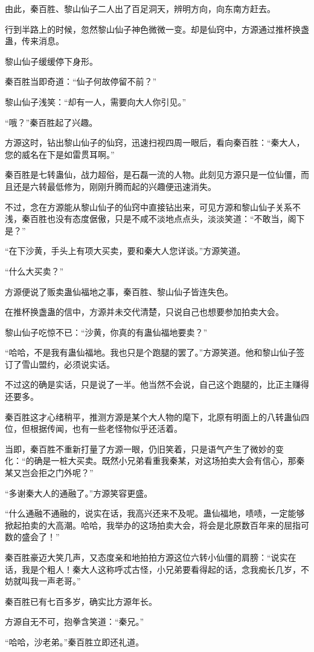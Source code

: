 \begin{this_body}
由此，秦百胜、黎山仙子二人出了百足洞天，辨明方向，向东南方赶去。

行到半路上的时候，忽然黎山仙子神色微微一变。却是仙窍中，方源通过推杯换盏蛊，传来消息。

黎山仙子缓缓停下身形。

秦百胜当即奇道：“仙子何故停留不前？”

黎山仙子浅笑：“却有一人，需要向大人你引见。”

“哦？”秦百胜起了兴趣。

方源这时，钻出黎山仙子的仙窍，迅速扫视四周一眼后，看向秦百胜：“秦大人，您的威名在下是如雷贯耳啊。”

秦百胜是七转蛊仙，战力超俗，是石磊一流的人物。此刻见方源只是一位仙僵，而且还是六转最低修为，刚刚升腾而起的兴趣便迅速消失。

不过，念在方源能从黎山仙子的仙窍中直接钻出来，可见方源和黎山仙子关系不浅，秦百胜也没有态度倨傲，只是不咸不淡地点点头，淡淡笑道：“不敢当，阁下是？”

“在下沙黄，手头上有项大买卖，要和秦大人您详谈。”方源笑道。

“什么大买卖？”

方源便说了贩卖蛊仙福地之事，秦百胜、黎山仙子皆连失色。

在推杯换盏蛊的信中，方源并未交代清楚，只说自己也想要参加拍卖大会。

黎山仙子吃惊不已：“沙黄，你真的有蛊仙福地要卖？”

“哈哈，不是我有蛊仙福地。我也只是个跑腿的罢了。”方源笑道。他和黎山仙子签订了雪山盟约，必须说实话。

不过这的确是实话，只是说了一半。他当然不会说，自己这个跑腿的，比正主赚得还要多。

秦百胜这才心绪稍平，推测方源是某个大人物的麾下，北原有明面上的八转蛊仙四位，但根据传闻，也有一些老怪物似乎还活着。

当即，秦百胜不重新打量了方源一眼，仍旧笑着，只是语气产生了微妙的变化：“的确是一桩大买卖。既然小兄弟看重我秦某，对这场拍卖大会有信心，那秦某又岂会拒之门外呢？”

“多谢秦大人的通融了。”方源笑容更盛。

“什么通融不通融的，说实在话，我高兴还来不及呢。蛊仙福地，啧啧，一定能够掀起拍卖的大高潮。哈哈，我举办的这场拍卖大会，将会是北原数百年来的屈指可数的盛会了！”

秦百胜豪迈大笑几声，又态度亲和地拍拍方源这位六转小仙僵的肩膀：“说实在话，我是个粗人！秦大人这称呼忒古怪，小兄弟要看得起的话，念我痴长几岁，不妨就叫我一声老哥。”

秦百胜已有七百多岁，确实比方源年长。

方源自无不可，抱拳含笑道：“秦兄。”

“哈哈，沙老弟。”秦百胜立即还礼道。

\end{this_body}

